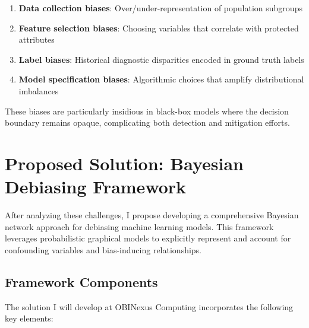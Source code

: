 \documentclass[12pt]{article}
\begin{document}
\begin{enumerate}
    \item \textbf{Data collection biases}: Over/under-representation of population subgroups
    \item \textbf{Feature selection biases}: Choosing variables that correlate with protected attributes
    \item \textbf{Label biases}: Historical diagnostic disparities encoded in ground truth labels
    \item \textbf{Model specification biases}: Algorithmic choices that amplify distributional imbalances
\end{enumerate}

These biases are particularly insidious in black-box models where the decision boundary remains opaque, complicating both detection and mitigation efforts.

\section{Proposed Solution: Bayesian Debiasing Framework}

After analyzing these challenges, I propose developing a comprehensive Bayesian network approach for debiasing machine learning models. This framework leverages probabilistic graphical models to explicitly represent and account for confounding variables and bias-inducing relationships.

\subsection{Framework Components}

The solution I will develop at OBINexus Computing incorporates the following key elements:
\end{document}
